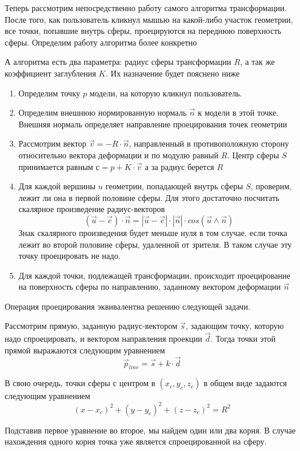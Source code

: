 \documentclass[14pt, a4paper]{extarticle}
\begin{document}
Теперь рассмотрим непосредственно работу самого алгоритма трансформации. После
того, как пользователь кликнул мышью на какой-либо участок геометрии, все точки,
попавшие внутрь сферы, проецируются на переднюю поверхность сферы. Определим
работу алгоритма более конкретно

А алгоритма есть два параметра: радиус сферы трансформации $R$, а так же
коэффициент заглубления $K$. Их назначение будет пояснено ниже

\begin{enumerate}
    \item Определим точку $p$ модели, на которую кликнул пользователь.
    \item Определим внешнюю нормированную нормаль $\vec{n}$ к модели в этой
    точке. Внешняя нормаль определяет направление проецирования точек геометрии
    \item Рассмотрим вектор $\vec{v} = - R \cdot \vec{n}$,
    направленный в противоположную сторону относительно вектора деформации и по
    модулю равный $R$. Центр сферы $S$ принимается равным $с = p + K \cdot \vec{v}$
    а за радиус берется $R$
    \item Для каждой вершины $u$ геометрии, попадающей внутрь сферы $S$, проверим,
    лежит ли она в первой половине сферы. Для этого достаточно посчитать
    скалярное произведение радиус-векторов
    $$(\vec{u}-\vec{c}) \cdot \vec{n} = |\vec{u}-\vec{c}| \cdot |\vec{n}| \cdot
    cos(\vec{u} \wedge \vec{n})$$
    Знак скалярного произведения будет меньше нуля в том случае,
    если точка лежит во второй половине сферы, удаленной от зрителя. В таком
    случае эту точку проецировать не надо.
    \item Для каждой точки, подлежащей трансформации, происходит проецирование на
    поверхность сферы по направлению, заданному вектором деформации $\vec{n}$
\end{enumerate}

Операция проецирования эквивалентна решению следующей задачи.

Рассмотрим прямую, заданную радиус-вектором $\vec{s}$, задающим точку, которую
надо спроецировать, и вектором направления проекции $\vec{d}$. Тогда точки этой
прямой выражаются следующим уравнением
$$ \vec{p}_{line} = \vec{s} + k \cdot \vec{d} $$

В свою очередь, точки сферы с центром в $(x_c, y_c, z_c)$ в общем виде задаются
следующим уравнением
$$ (x-x_c)^2 + (y-y_c)^2 + (z-z_c)^2 = R^2 $$

Подставив первое уравнение во второе, мы найдем один или два корня. В случае
нахождения одного корня точка уже является спроецированной на сферу.
\end{document}
